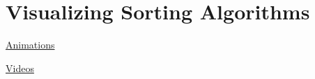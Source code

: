 \documentclass[8pt,a4paper,compress]{beamer}
\begin{document}
\section{Visualizing Sorting Algorithms}
\begin{frame}[fragile]
\pause

\href{http://www.sorting-algorithms.com/}{Animations}

\begin{center}
\end{center}
\end{frame}

\begin{frame}[fragile]
\pause

\href{https://www.youtube.com/user/AlgoRythmics/videos}{Videos}

\begin{center}
\end{center}
\end{frame}
\end{document}
